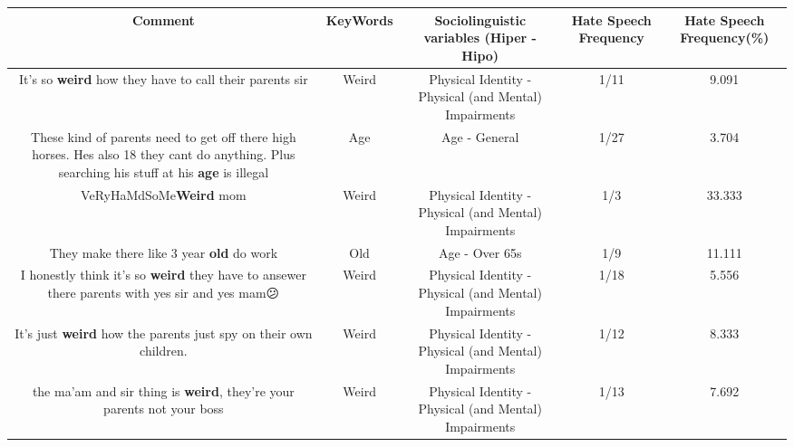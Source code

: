 \documentclass[11pt]{article}
\newlength\mylength
\begin{document}
\begin{center}
\setlength\mylength{\dimexpr\textwidth - 1\arrayrulewidth - 50\tabcolsep}
\begin{longtable}{|C{.65\mylength}|C{.30\mylength}|C{.12\mylength}|C{.12\mylength}|C{.12\mylength}|}
\hline
\textbf{Comment} & \textbf{KeyWords} & \textbf{Sociolinguistic variables (Hiper - Hipo)}  & \textbf{Hate Speech Frequency} & \textbf{Hate Speech Frequency(\%)} \\
\hline{}\small It's so \textbf{weird} how they have to call their parents sir\normalsize   & Weird & Physical Identity - Physical (and Mental) Impairments & 1/11 & 9.091 \\  \hline
  \small These kind of parents need to get off there high horses. Hes also 18 they cant do anything. Plus searching his stuff at his \textbf{age} is illegal\normalsize   & Age & Age - General & 1/27 & 3.704 \\  \hline
  \small VeRyHaMdSoMe\textbf{Weird} mom\normalsize   & Weird & Physical Identity - Physical (and Mental) Impairments & 1/3 & 33.333 \\  \hline
  \small They make there like 3 year \textbf{old} do work\normalsize   & Old & Age - Over 65s & 1/9 & 11.111 \\  \hline
  \small I honestly think it's so \textbf{weird} they have to ansewer there parents with yes sir and yes mam😕\normalsize   & Weird & Physical Identity - Physical (and Mental) Impairments & 1/18 & 5.556 \\  \hline
  \small It's just \textbf{weird} how the parents just spy on their own children.\normalsize   & Weird & Physical Identity - Physical (and Mental) Impairments & 1/12 & 8.333 \\  \hline
  \small the ma'am and sir thing is \textbf{weird}, they're your parents not your boss\normalsize   & Weird & Physical Identity - Physical (and Mental) Impairments & 1/13 & 7.692 \\  \hline

\end{longtable}
\end{center}
\end{document}
